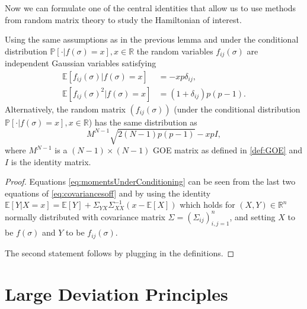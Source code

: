 Now we can formulate one of the central identities that allow us to use methods from random matrix theory to study the Hamiltonian of interest.

\begin{lemma}
	Using the same assumptions as in the previous lemma and under the conditional distribution $\mathbb P[\cdot|f(\sigma)=x], x\in\mathbb R$ the random variables $f_{ij}(\sigma)$ are independent Gaussian variables satisfying
	\begin{align}\label{eq:momentsUnderConditioning}
		\mathbb E[f_{ij}(\sigma)|f(\sigma)=x]&=-xp\delta_{ij},\nonumber\\
		\mathbb E[f_{ij}(\sigma)^2|f(\sigma)=x]&=(1+\delta_{ij})p(p-1).
	\end{align}
	Alternatively, the random matrix $(f_{ij}(\sigma))$ (under the conditional distribution $\mathbb P[\cdot|f(\sigma)=x], x\in\mathbb R$) has the same distribution as $$M^{N-1}\sqrt{2(N-1)p(p-1)}-xpI,$$
	where $M^{N-1}$ is a $(N-1)\times(N-1)$ GOE matrix as defined in \ref{def:GOE} and $I$ is the identity matrix.
\end{lemma}
\begin{proof}
	Equations \eqref{eq:momentsUnderConditioning} can be seen from the last two equations of \eqref{eq:covariancesoff} and by using the identity $\mathbb E[Y|X=x] = \mathbb E[Y] + \Sigma_{YX}\Sigma^{-1}_{XX}(x-\mathbb E[X])$ which holds for $(X,Y)\in\mathbb R^n$ normally distributed with covariance matrix $\Sigma = (\Sigma_{ij})_{i,j=1}^n$, and setting $X$ to be $f(\sigma)$ and $Y$ to be $f_{ij}(\sigma)$.
	
	
	The second statement follows by plugging in the definitions.
\end{proof}




\section{Large Deviation Principles}

